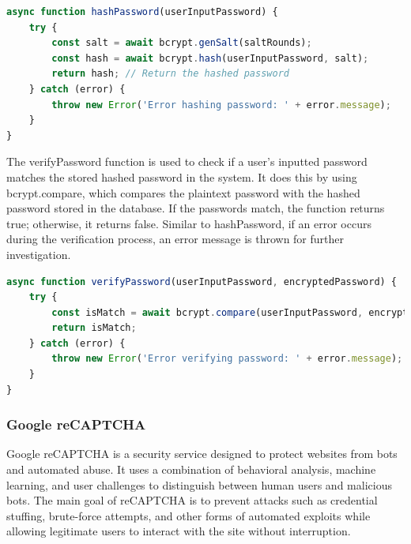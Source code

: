 \begin{lstlisting}[language=Javascript, breaklines=true, caption=Password Hashing]
async function hashPassword(userInputPassword) {
	try {
		const salt = await bcrypt.genSalt(saltRounds);
		const hash = await bcrypt.hash(userInputPassword, salt);
		return hash; // Return the hashed password
	} catch (error) {
		throw new Error('Error hashing password: ' + error.message);
	}
}
\end{lstlisting}

	The verifyPassword function is used to check if a user's inputted password matches the stored hashed password in the system. It does this by using bcrypt.compare, which compares the plaintext password with the hashed password stored in the database. If the passwords match, the function returns true; otherwise, it returns false. Similar to hashPassword, if an error occurs during the verification process, an error message is thrown for further investigation.
	
\begin{lstlisting}[language=Javascript, breaklines=true, caption=Password Verification]
async function verifyPassword(userInputPassword, encryptedPassword) {
	try {
		const isMatch = await bcrypt.compare(userInputPassword, encryptedPassword);
		return isMatch;
	} catch (error) {
		throw new Error('Error verifying password: ' + error.message);
	}
}
\end{lstlisting}
	
	
	
	\subsubsection{Google reCAPTCHA}
	Google reCAPTCHA is a security service designed to protect websites from bots and automated abuse. It uses a combination of behavioral analysis, machine learning, and user challenges to distinguish between human users and malicious bots. The main goal of reCAPTCHA is to prevent attacks such as credential stuffing, brute-force attempts, and other forms of automated exploits while allowing legitimate users to interact with the site without interruption. \cite{google-recaptcha}
	
